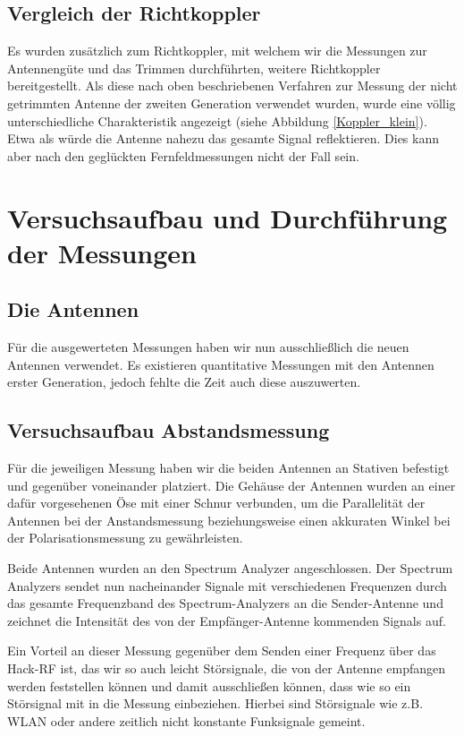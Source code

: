 \documentclass[titlepage,11pt,a4paper,ngerman]{article}
\begin{document}
\subsection{Vergleich der Richtkoppler}

Es wurden zusätzlich zum Richtkoppler, mit welchem wir die Messungen zur Antennengüte und das Trimmen durchführten, weitere Richtkoppler bereitgestellt. Als diese nach oben beschriebenen Verfahren zur Messung der nicht getrimmten Antenne der zweiten Generation verwendet wurden, wurde eine völlig unterschiedliche Charakteristik angezeigt (siehe Abbildung \ref{Koppler_klein}). Etwa als würde die Antenne nahezu das gesamte Signal reflektieren. Dies kann aber nach den geglückten Fernfeldmessungen nicht der Fall sein.

\section{Versuchsaufbau und Durchführung der Messungen}
\label{Versuchsaufbau} 

\subsection{Die Antennen}

Für die ausgewerteten Messungen haben wir nun ausschließlich die neuen Antennen verwendet. Es existieren quantitative Messungen mit den Antennen erster Generation, jedoch fehlte die Zeit auch diese auszuwerten.

\subsection{Versuchsaufbau Abstandsmessung}

Für die jeweiligen Messung haben wir die beiden Antennen an Stativen befestigt und gegenüber voneinander platziert. Die Gehäuse der Antennen wurden an einer dafür vorgesehenen Öse mit einer Schnur verbunden, um die Parallelität der Antennen bei der Anstandsmessung beziehungsweise einen akkuraten Winkel bei der Polarisationsmessung zu gewährleisten.\par
Beide Antennen wurden an den Spectrum Analyzer angeschlossen. Der Spectrum Analyzers sendet nun nacheinander Signale mit verschiedenen Frequenzen durch das gesamte Frequenzband des Spectrum-Analyzers an die Sender-Antenne und zeichnet die Intensität des von der Empfänger-Antenne kommenden Signals auf.\par
Ein Vorteil an dieser Messung gegenüber dem Senden einer Frequenz über das Hack-RF ist, das wir so auch leicht Störsignale, die von der Antenne empfangen werden feststellen können und damit ausschließen können, dass wie so ein Störsignal mit in die Messung einbeziehen. Hierbei sind Störsignale wie z.B. WLAN oder andere zeitlich nicht konstante Funksignale gemeint.
\end{document}
